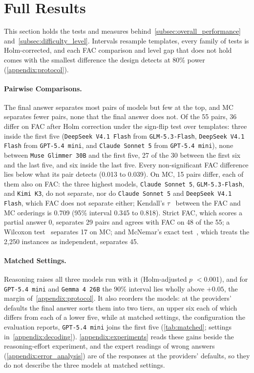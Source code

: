 \section{Full Results}
\label{appendix:results}

This section holds the tests and measures behind~\autoref{subsec:overall_performance}
and~\autoref{subsec:difficulty_level}.
Intervals resample templates, every family of tests is Holm-corrected, and each FAC comparison and
level gap that does not hold comes with the smallest difference the design detects at 80\% power
(\autoref{appendix:protocol}).

\paragraph{Pairwise Comparisons.} The final answer separates most pairs of models but few at the
top, and MC separates fewer pairs, none that the final answer does not.
Of the 55 pairs, 36 differ on FAC after Holm correction under the sign-flip test over templates:
three inside the first five (\texttt{DeepSeek V4.1 Flash} from \texttt{GLM-5.3-Flash},
\texttt{DeepSeek V4.1 Flash} from \texttt{GPT-5.4 mini}, and \texttt{Claude Sonnet 5} from
\texttt{GPT-5.4 mini}), none between \texttt{Muse Glimmer 30B} and the first five, 27 of the 30
between the first six and the last five, and six inside the last five.
Every non-significant FAC difference lies below what its pair detects (0.013 to 0.039).
On MC, 15 pairs differ, each of them also on FAC: the three highest models,
\texttt{Claude Sonnet 5}, \texttt{GLM-5.3-Flash}, and \texttt{Kimi K3}, do not separate, nor do
\texttt{Claude Sonnet 5} and \texttt{DeepSeek V4.1 Flash}, which FAC does not separate either;
Kendall's $\tau$~\citep{kendall1938} between the FAC and MC orderings is 0.709 (95\% interval 0.345
to 0.818).
Strict FAC, which scores a partial answer 0, separates 29 pairs and agrees with FAC on 48 of the 55;
a Wilcoxon test~\citep{wilcoxon1945} separates 17 on MC; and McNemar's exact
test~\citep{mcnemar1947}, which treats the 2,250 instances as independent, separates 45.

\paragraph{Matched Settings.} Reasoning raises all three models run with it (Holm-adjusted $p$
$<$0.001), and for \texttt{GPT-5.4 mini} and \texttt{Gemma 4 26B} the 90\% interval lies wholly
above $+0.05$, the margin of~\autoref{appendix:protocol}.
It also reorders the models: at the providers' defaults the final answer sorts them into two tiers,
an upper six each of which differs from each of a lower five, while at matched settings, the
configuration the evaluation reports, \texttt{GPT-5.4 mini} joins the first five
(\autoref{tab:matched}; settings in~\autoref{appendix:decoding}).
\autoref{appendix:experiments} reads these gains beside the reasoning-effort experiment, and the
expert readings of wrong answers (\autoref{appendix:error_analysis}) are of the responses at the
providers' defaults, so they do not describe the three models at matched settings.

